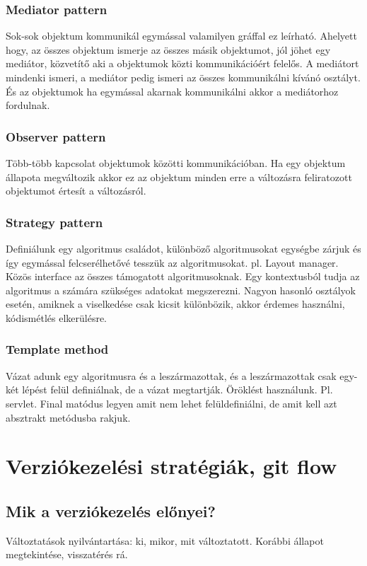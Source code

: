 \documentclass[a4paper,14pt]{extarticle}
\begin{document}
			\subsubsection{Mediator pattern}
			Sok-sok objektum kommunikál egymással valamilyen gráffal ez leírható. Ahelyett hogy, az összes objektum ismerje az összes másik objektumot, jól jöhet egy mediátor, közvetítő aki a objektumok közti kommunikációért felelős. A mediátort mindenki ismeri, a mediátor pedig ismeri az összes kommunikálni kívánó osztályt. És az objektumok ha egymással akarnak kommunikálni akkor a mediátorhoz fordulnak.
			
			\subsubsection{Observer pattern}
			Több-több kapcsolat objektumok közötti kommunikációban. Ha egy objektum állapota megváltozik akkor ez az objektum minden erre a változásra feliratozott objektumot értesít a változásról.
			
			\subsubsection{Strategy pattern}
			Definiálunk egy algoritmus családot, különböző algoritmusokat egységbe zárjuk és így egymással felcserélhetővé tesszük az algoritmusokat. pl. Layout manager.
			Közös interface az összes támogatott algoritmusoknak. Egy kontextusból tudja az algoritmus a számára szükséges adatokat megszerezni. Nagyon hasonló osztályok esetén, amiknek a  viselkedése csak kicsit különbözik, akkor érdemes használni, kódismétlés elkerülésre.
			
			\subsubsection{Template method}						
			Vázat adunk egy algoritmusra és a leszármazottak, és a leszármazottak csak egy-két lépést felül definiálnak, de a vázat megtartják. Öröklést használunk. \newline Pl. servlet. \newline 
			Final matódus legyen amit nem lehet felüldefiniálni, de amit kell azt absztrakt metódusba rakjuk.
			
	\section{Verziókezelési stratégiák, git flow}
		\subsection{Mik a verziókezelés előnyei?}
			Változtatások nyilvántartása: ki, mikor, mit változtatott.
			Korábbi állapot megtekintése, visszatérés rá.
\end{document}
